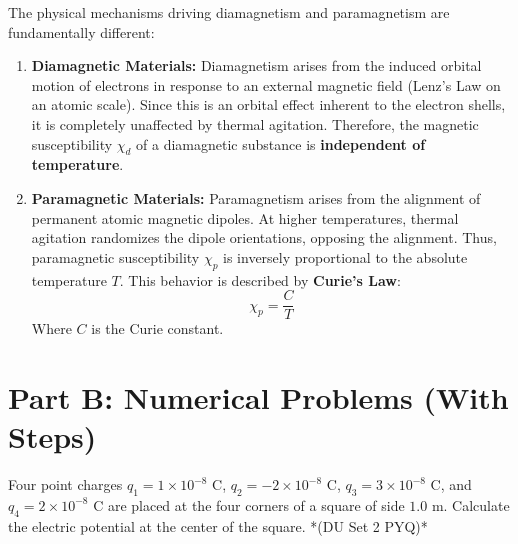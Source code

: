 \documentclass[11pt,a4paper]{article}
\begin{document}
\begin{solutionbox}
    The physical mechanisms driving diamagnetism and paramagnetism are fundamentally different:
    \begin{enumerate}
        \item \textbf{Diamagnetic Materials:} Diamagnetism arises from the induced orbital motion of electrons in response to an external magnetic field (Lenz's Law on an atomic scale). Since this is an orbital effect inherent to the electron shells, it is completely unaffected by thermal agitation. Therefore, the magnetic susceptibility $\chi_d$ of a diamagnetic substance is \textbf{independent of temperature}.
        \item \textbf{Paramagnetic Materials:} Paramagnetism arises from the alignment of permanent atomic magnetic dipoles. At higher temperatures, thermal agitation randomizes the dipole orientations, opposing the alignment. Thus, paramagnetic susceptibility $\chi_p$ is inversely proportional to the absolute temperature $T$. This behavior is described by \textbf{Curie's Law}:
        \[ \chi_p = \frac{C}{T} \]
        Where $C$ is the Curie constant.
    \end{enumerate}
\end{solutionbox}

\newpage
\section{Part B: Numerical Problems (With Steps)}

\begin{questionbox}
    Four point charges $q_1 = 1 \times 10^{-8}\text{ C}$, $q_2 = -2 \times 10^{-8}\text{ C}$, $q_3 = 3 \times 10^{-8}\text{ C}$, and $q_4 = 2 \times 10^{-8}\text{ C}$ are placed at the four corners of a square of side $1.0\text{ m}$. Calculate the electric potential at the center of the square. *(DU Set 2 PYQ)*
\end{questionbox}
\end{document}
